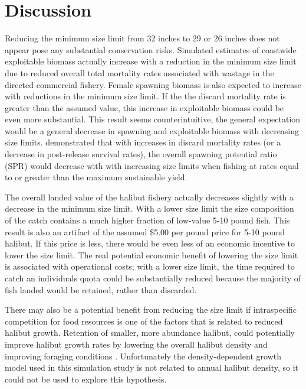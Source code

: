 
\section{Discussion} %
\label{sec:discussion}
Reducing the minimum size limit from 32 inches to 29 or 26 inches does not appear pose any substantial conservation risks.  Simulated estimates of coastwide exploitable biomass actually increase with a reduction in the minimum size limit due to reduced overall total mortality rates associated with wastage in the directed commercial fishery. Female spawning biomass is also expected to increase with reductions in the minimum size limit. If the the discard mortality rate is greater than the assumed value, this increase in exploitable biomass could be even more substantial.  This result seems counterintuitive, the general expectation would be a general decrease in spawning and exploitable biomass with decreasing size limits.  \cite{pineiii2008car} demonstrated that with increases in discard mortality rates (or a decrease in post-release survival rates), the overall spawning potential ratio (SPR) would decrease with with increasing size limits when fishing at rates equal to or greater than the maximum sustainable yield.

The overall landed value of the halibut fishery actually decreases slightly with a decrease in the minimum size limit.  With a lower size limit the size composition of the catch contains a much higher fraction of low-value 5-10 pound fish.  This result is also an artifact of the assumed \$5.00 per pound price for 5-10 pound halibut.  If this price is less, there would be even less of an economic incentive to lower the size limit.   The real potential economic benefit of lowering the size limit is associated with operational costs; with a lower size limit, the time required to catch an individuals quota could be substantially reduced because the majority of fish landed would be retained, rather than discarded.

There may also be a potential benefit from reducing the size limit if intraspecific competition for food resources is one of the factors that is related to reduced halibut growth. Retention of smaller, more abundance halibut, could potentially improve halibut growth rates by lowering the overall halibut density and improving foraging conditions \citep{walters1993recruitment,WalMart2004}.  Unfortunately the density-dependent growth model used in this simulation study is not related to annual halibut density, so it could not be used to explore this hypothesis.

